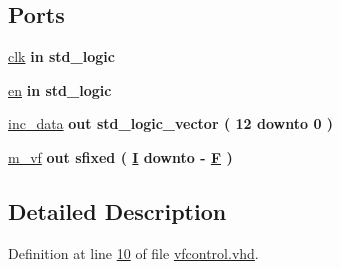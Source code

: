 \subsection*{Ports}
 \begin{DoxyCompactItemize}
\item 
\hyperlink{classvfcontrol_a4a4609c199d30b3adebbeb3a01276ec5}{clk}  {\bfseries {\bfseries \textcolor{keywordflow}{in}\textcolor{vhdlchar}{ }}} {\bfseries \textcolor{comment}{std\+\_\+logic}\textcolor{vhdlchar}{ }} 
\item 
\hyperlink{classvfcontrol_adcf9c6f5161d039addbda5819bee64a3}{en}  {\bfseries {\bfseries \textcolor{keywordflow}{in}\textcolor{vhdlchar}{ }}} {\bfseries \textcolor{comment}{std\+\_\+logic}\textcolor{vhdlchar}{ }} 
\item 
\hyperlink{classvfcontrol_af402b7ce8e1b9ac1038c575460c5d156}{inc\+\_\+data}  {\bfseries {\bfseries \textcolor{keywordflow}{out}\textcolor{vhdlchar}{ }}} {\bfseries \textcolor{comment}{std\+\_\+logic\+\_\+vector}\textcolor{vhdlchar}{ }\textcolor{vhdlchar}{(}\textcolor{vhdlchar}{ }\textcolor{vhdlchar}{ } \textcolor{vhdldigit}{12} \textcolor{vhdlchar}{ }\textcolor{keywordflow}{downto}\textcolor{vhdlchar}{ }\textcolor{vhdlchar}{ } \textcolor{vhdldigit}{0} \textcolor{vhdlchar}{ }\textcolor{vhdlchar}{)}\textcolor{vhdlchar}{ }} 
\item 
\hyperlink{classvfcontrol_a556e3576ef1696c57d447032f986bf5a}{m\+\_\+vf}  {\bfseries {\bfseries \textcolor{keywordflow}{out}\textcolor{vhdlchar}{ }}} {\bfseries \textcolor{comment}{sfixed}\textcolor{vhdlchar}{ }\textcolor{vhdlchar}{(}\textcolor{vhdlchar}{ }\textcolor{vhdlchar}{ }\textcolor{vhdlchar}{ }\textcolor{vhdlchar}{ }{\bfseries \hyperlink{classvfcontrol_abb7ce405d45a733b6db94314a4f791fd}{I}} \textcolor{vhdlchar}{ }\textcolor{keywordflow}{downto}\textcolor{vhdlchar}{ }\textcolor{vhdlchar}{-\/}\textcolor{vhdlchar}{ }\textcolor{vhdlchar}{ }\textcolor{vhdlchar}{ }{\bfseries \hyperlink{classvfcontrol_aac2d6825f96b21ae984648cc93554339}{F}} \textcolor{vhdlchar}{ }\textcolor{vhdlchar}{)}\textcolor{vhdlchar}{ }} 
\end{DoxyCompactItemize}


\subsection{Detailed Description}


Definition at line \hyperlink{vfcontrol_8vhd_source_l00010}{10} of file \hyperlink{vfcontrol_8vhd_source}{vfcontrol.\+vhd}.



